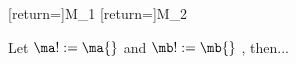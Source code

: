 \documentclass{stex}
\begin{document}

[return=\monoid]{M_1}
[return=\monoid]{M_2}

Let $\ma!:=\ma{}$ and $\mb!:=\mb{}$ , then...
\end{document}
